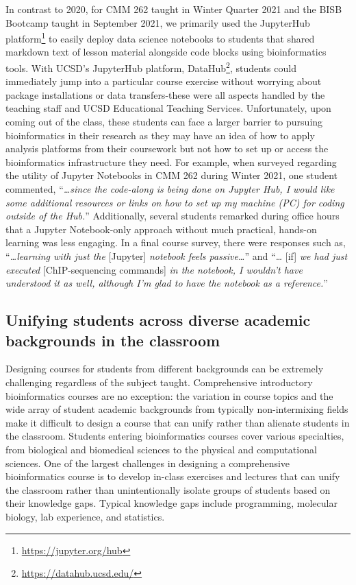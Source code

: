In contrast to 2020, for CMM 262 taught in Winter Quarter 2021 and the BISB Bootcamp taught in September 2021, we primarily used the JupyterHub platform\footnote{\url{https://jupyter.org/hub}} to easily deploy data science notebooks to students that shared markdown text of lesson material alongside code blocks using bioinformatics tools. With UCSD's JupyterHub platform, DataHub\footnote{\url{https://datahub.ucsd.edu/}}, students could immediately jump into a particular course exercise without worrying about package installations or data transfers-these were all aspects handled by the teaching staff and UCSD Educational Teaching Services. Unfortunately, upon coming out of the class, these students can face a larger barrier to pursuing bioinformatics in their research as they may have an idea of how to apply analysis platforms from their coursework but not how to set up or access the bioinformatics infrastructure they need. For example, when surveyed regarding the utility of Jupyter Notebooks in CMM 262 during Winter 2021, one student commented, “\textit{…since the code-along is being done on Jupyter Hub, I would like some additional resources or links on how to set up my machine (PC) for coding outside of the Hub.}” Additionally, several students remarked during office hours that a Jupyter Notebook-only approach without much practical, hands-on learning was less engaging. In a final course survey, there were responses such as, “\textit{…learning with just the} [Jupyter] \textit{notebook feels passive…}” and “\textit{…} [if] \textit{we had just executed} [ChIP-sequencing commands] \textit{in the notebook, I wouldn't have understood it as well, although I'm glad to have the notebook as a reference.}”

\subsection{Unifying students across diverse academic backgrounds in the classroom}

Designing courses for students from different backgrounds can be extremely challenging regardless of the subject taught. Comprehensive introductory bioinformatics courses are no exception: the variation in course topics and the wide array of student academic backgrounds from typically non-intermixing fields make it difficult to design a course that can unify rather than alienate students in the classroom. Students entering bioinformatics courses cover various specialties, from biological and biomedical sciences to the physical and computational sciences. One of the largest challenges in designing a comprehensive bioinformatics course is to develop in-class exercises and lectures that can unify the classroom rather than unintentionally isolate groups of students based on their knowledge gaps. Typical knowledge gaps include programming, molecular biology, lab experience, and statistics. 

